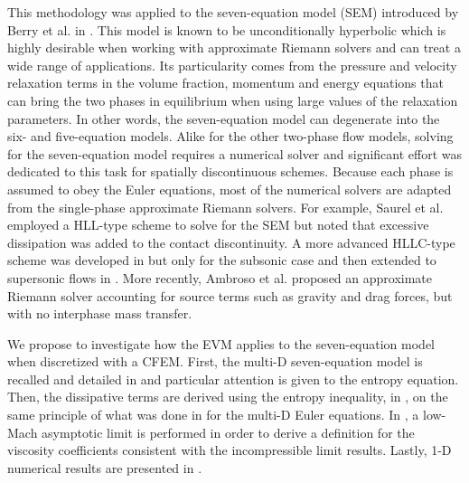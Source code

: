 This methodology was applied to the seven-equation model (SEM) introduced by Berry et al. in \cite{SEM}. This model is known to be unconditionally hyperbolic which is highly desirable when working with approximate Riemann solvers and can treat a wide range of applications. Its particularity comes from the pressure and velocity relaxation terms in the volume fraction, momentum and energy equations that can bring the two phases in equilibrium when using large values of the relaxation parameters. In other words, the seven-equation model can degenerate into the six- and five-equation models. Alike for the other two-phase flow models, solving for the seven-equation model requires a numerical solver and significant effort was dedicated to this task for spatially discontinuous schemes. Because each phase is assumed to obey the Euler equations, most of the numerical solvers are adapted from the single-phase approximate Riemann solvers. For example, Saurel et al. \cite{Saurel_2001a, Saurel_2001b} employed a HLL-type scheme to solve for the SEM but noted that excessive dissipation was added to the contact discontinuity. A more advanced HLLC-type scheme was developed in \cite{Li_2004} but only for the subsonic case and then extended to supersonic flows in \cite{Zein_2010}. More recently, Ambroso et al. \cite{Ambroso_2012} proposed an approximate Riemann solver accounting for source terms such as gravity and drag forces, but with no interphase mass transfer.

We propose to investigate how the EVM applies to the seven-equation model when discretized with a CFEM. First, the multi-D seven-equation model is recalled and detailed in  and particular attention is given to the entropy equation. Then, the dissipative terms are derived using the entropy inequality, in , on the same principle of what was done in  for the multi-D Euler equations. In , a low-Mach asymptotic limit is performed in order to derive a definition for the viscosity coefficients consistent with the incompressible limit results. Lastly, 1-D numerical results are presented in .

